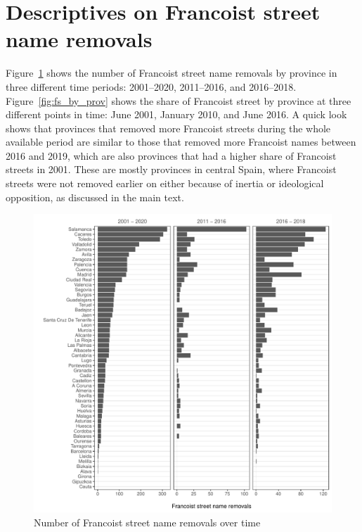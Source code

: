 \documentclass[12pt, titlepage]{article}
\begin{document}
\clearpage
\section{Descriptives on Francoist street name removals}

Figure~\ref{fig:changes_by_prov} shows the number of Francoist street name removals by province in three different time periods: 2001--2020, 2011--2016, and 2016--2018.
Figure~\ref{fig:fs_by_prov} shows the share of Francoist street by province at three different points in time: June 2001, January 2010, and June 2016.
A quick look shows that provinces that removed more Francoist streets during the whole available period are similar to those that removed more Francoist names between 2016 and 2019, which are also provinces that had a higher share of Francoist streets in 2001.
These are mostly provinces in central Spain, where Francoist streets were not removed earlier on either because of inertia or ideological opposition, as discussed in the main text.

\begin{figure}[htb!]
\centering

  \includegraphics[width = \textwidth]{img/changes_by_prov}

  \caption{Number of Francoist street name removals over time}\label{fig:changes_by_prov}

\end{figure}
\end{document}
